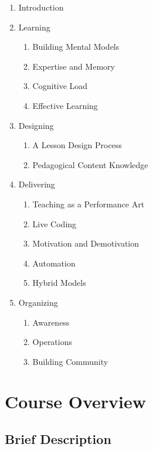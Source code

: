 \begin{enumerate}
\item
  Introduction

\item
  Learning
  \begin{enumerate}
  \item
    Building Mental Models %
  \item
    Expertise and Memory %
  \item
    Cognitive Load %
  \item
    Effective Learning %
  \end{enumerate}

\item
  Designing
  \begin{enumerate}
  \item
    A Lesson Design Process %
  \item
    Pedagogical Content Knowledge %
  \end{enumerate}

\item
  Delivering
  \begin{enumerate}
  \item
    Teaching as a Performance Art %
  \item
    Live Coding %
  \item
    Motivation and Demotivation %
  \item
    Automation %
  \item
    Hybrid Models %
  \end{enumerate}

\item
  Organizing
  \begin{enumerate}
  \item
    Awareness %
  \item
    Operations %
  \item
    Building Community %
  \end{enumerate}

\end{enumerate}

\section*{Course Overview}

\subsection*{Brief Description}

